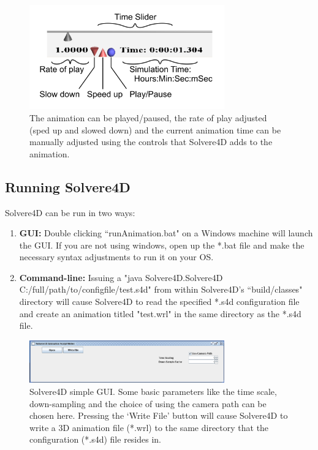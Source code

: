 \documentclass[singlecolumn,12pt]{article}
\begin{document}
\begin{center}
\begin{figure}[!h]
\includegraphics[width = 0.75\textwidth, height = 0.75\textheight, keepaspectratio= true]{fig_timecontrols_detail}
\caption{The animation can be played/paused, the rate of play
adjusted (sped up and slowed down) and the current animation time
can be manually adjusted using the controls that Solvere4D adds to
the animation.\label{fig_timecontrols_detail}}
\end{figure}
\end{center}

\subsection{Running Solvere4D}

Solvere4D can be run in two ways:

\begin{enumerate}
\item \textbf{GUI:} Double clicking ``runAnimation.bat" on a Windows machine
will launch the GUI. If you are not using windows, open up the *.bat
file and make the necessary syntax adjustments to run it on your OS.


\item \textbf{Command-line:} Issuing a "java Solvere4D.Solvere4D
C:/full/path/to/configfile/test.s4d" from within Solvere4D's
``build/classes" directory will cause Solvere4D to read the
specified
*.s4d configuration file and create an animation titled "test.wrl"
in the same directory as the *.s4d file.
\end{enumerate}

\begin{center}
\begin{figure}[!h]
\includegraphics[width = 0.75\textwidth, height = 0.75\textheight, keepaspectratio= true]{fig_solvere4D_gui}
\caption{Solvere4D simple GUI. Some basic parameters like the time
scale, down-sampling and the choice of using the camera path can be
chosen here. Pressing the `Write File' button will cause Solvere4D
to write a 3D animation file (*.wrl) to the same directory that the
 configuration (*.s4d) file resides in.\label{fig_solvere4D_gui}}
\end{figure}
\end{center}
\end{document}
